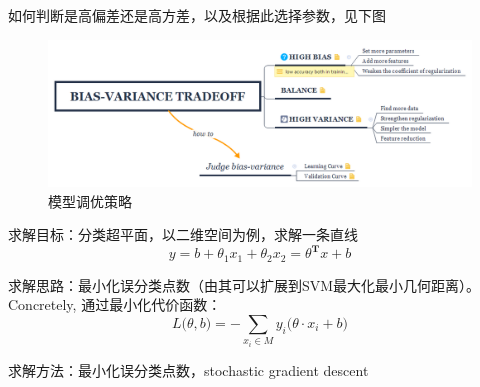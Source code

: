 \documentclass{ctexart}
\begin{document}
如何判断是高偏差还是高方差，以及根据此选择参数，见下图


\begin{figure}[H]
\begin{center}
\includegraphics[width=1\textwidth]{fig/Bias-variance tradeoff.png} %
\caption{模型调优策略}
\end{center}
\end{figure}



求解目标：分类超平面，以二维空间为例，求解一条直线
\begin{equation}
y = b+\theta_1x_1+\theta_2x_2=\theta^{\mathbf{T}}x+b
\end{equation}

求解思路：最小化误分类点数（由其可以扩展到SVM最大化最小几何距离）。Concretely, 通过最小化代价函数\cite{LiHang:Statistic}：
\begin{equation}
L\big(\theta,b \big)=-\sum\limits_{x_i\in M}y_i\big(\theta\cdot x_i+b\big)
\end{equation}

求解方法：最小化误分类点数，stochastic gradient descent
\end{document}
